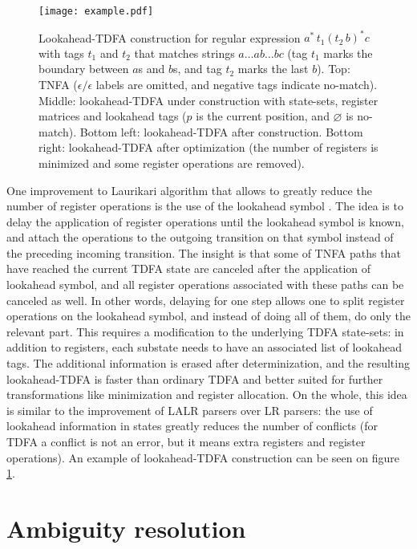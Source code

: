 \documentclass[preprint,12pt, a4paper]{elsarticle}
\begin{document}
\begin{figure}[t!]
\texttt{[image: example.pdf]}
\caption{
Lookahead-TDFA construction for regular expression $a^* \, t_1 (t_2 \, b)^* c \;$ with tags $t_1$ and $t_2$
that matches strings $a \dots a b \dots b c$ (tag $t_1$ marks the boundary between $a$s and $b$s, and tag $t_2$ marks the last $b$).
Top: TNFA ($\epsilon/\epsilon$ labels are omitted, and negative tags indicate no-match).
Middle: lookahead-TDFA under construction with state-sets, register matrices and lookahead tags
($p$ is the current position, and $\varnothing$ is no-match).
Bottom left: lookahead-TDFA after construction.
Bottom right: lookahead-TDFA after optimization (the number of registers is minimized and some register operations are removed).
}\label{fig:example}
\end{figure}

\noindent
One improvement to Laurikari algorithm that allows to greatly reduce the number of register operations is the use of the lookahead symbol \cite{Tro17}.
The idea is to delay the application of register operations until the lookahead symbol is known,
and attach the operations to the outgoing transition on that symbol instead of the preceding incoming transition.
The insight is that some of TNFA paths that have reached the current TDFA state are canceled after the application of lookahead symbol,
and all register operations associated with these paths can be canceled as well.
In other words, delaying for one step allows one to split register operations on the lookahead symbol,
and instead of doing all of them, do only the relevant part.
This requires a modification to the underlying TDFA state-sets:
in addition to registers, each substate needs to have an associated list of lookahead tags.
The additional information is erased after determinization,
and the resulting lookahead-TDFA is faster than ordinary TDFA and better suited for further transformations like minimization and register allocation.
On the whole, this idea is similar to the improvement of LALR parsers over LR parsers:
the use of lookahead information in states greatly reduces the number of conflicts
(for TDFA a conflict is not an error, but it means extra registers and register operations).
An example of lookahead-TDFA construction can be seen on figure \ref{fig:example}.


\section{Ambiguity resolution}
\end{document}
